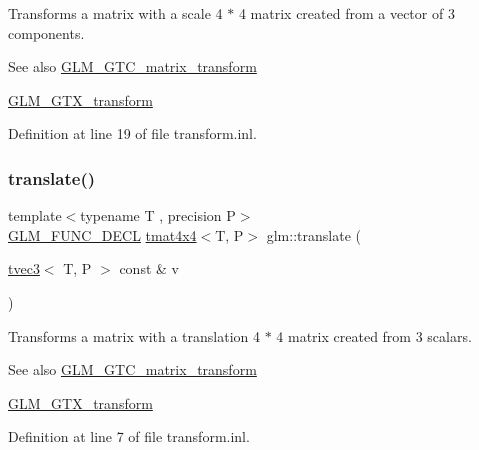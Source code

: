Transforms a matrix with a scale 4 $\ast$ 4 matrix created from a vector of 3 components. \begin{DoxySeeAlso}{See also}
\mbox{\hyperlink{group__gtc__matrix__transform}{G\+L\+M\+\_\+\+G\+T\+C\+\_\+matrix\+\_\+transform}} 

\mbox{\hyperlink{group__gtx__transform}{G\+L\+M\+\_\+\+G\+T\+X\+\_\+transform}} 
\end{DoxySeeAlso}


Definition at line 19 of file transform.\+inl.

\mbox{\label{group__gtx__transform_ga838c4505ef7f254ed05117b1ac9691fb}} 
\subsubsection{\texorpdfstring{translate()}{translate()}}
{\footnotesize\ttfamily template$<$typename T , precision P$>$ \\
\mbox{\hyperlink{setup_8hpp_ab2d052de21a70539923e9bcbf6e83a51}{G\+L\+M\+\_\+\+F\+U\+N\+C\+\_\+\+D\+E\+CL}} \mbox{\hyperlink{structglm_1_1tmat4x4}{tmat4x4}}$<$T, P$>$ glm\+::translate (\begin{DoxyParamCaption}\item[{\mbox{\hyperlink{structglm_1_1tvec3}{tvec3}}$<$ T, P $>$ const \&}]{v }\end{DoxyParamCaption})}

Transforms a matrix with a translation 4 $\ast$ 4 matrix created from 3 scalars. \begin{DoxySeeAlso}{See also}
\mbox{\hyperlink{group__gtc__matrix__transform}{G\+L\+M\+\_\+\+G\+T\+C\+\_\+matrix\+\_\+transform}} 

\mbox{\hyperlink{group__gtx__transform}{G\+L\+M\+\_\+\+G\+T\+X\+\_\+transform}} 
\end{DoxySeeAlso}


Definition at line 7 of file transform.\+inl.

